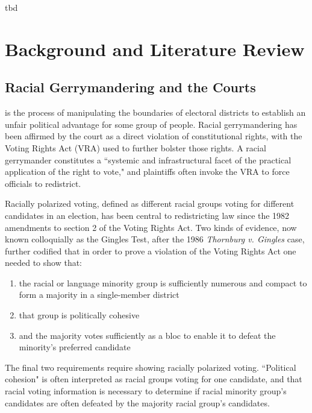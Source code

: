 \begin{savequote}[75mm]
tbd
\end{savequote}

\chapter{Background and Literature Review}
\label{chap:background}

\section{Racial Gerrymandering and the Courts}

 is the process of manipulating the boundaries of electoral districts to establish an unfair political advantage for some group of people. Racial gerrymandering has been affirmed by the court as a direct violation of constitutional rights, with the Voting Rights Act (VRA) used to further bolster those rights. A racial gerrymander constitutes a ``systemic and infrastructural facet of the practical application of the right to vote,"\cite{greiner} and plaintiffs often invoke the VRA to force officials to redistrict.

Racially polarized voting, defined as different racial groups voting for different candidates in an election, has been central to redistricting law since the 1982 amendments to section 2 of the Voting Rights Act.\cite{greiner} Two kinds of evidence, now known colloquially as the Gingles Test, after the 1986 \textit{Thornburg v. Gingles}\cite{thornburg} case, further codified that in order to prove a violation of the Voting Rights Act one needed to show that:

\begin{enumerate}
 \item the racial or language minority group is sufficiently numerous and compact to form a majority in a single-member district
 \item that group is politically cohesive
 \item and the majority votes sufficiently as a bloc to enable it to defeat the minority’s preferred candidate
\end{enumerate}

The final two requirements require showing racially polarized voting. ``Political cohesion" is often interpreted as racial groups voting for one candidate, and that racial voting information is necessary to determine if racial minority group's candidates are often defeated by the majority racial group's candidates.

